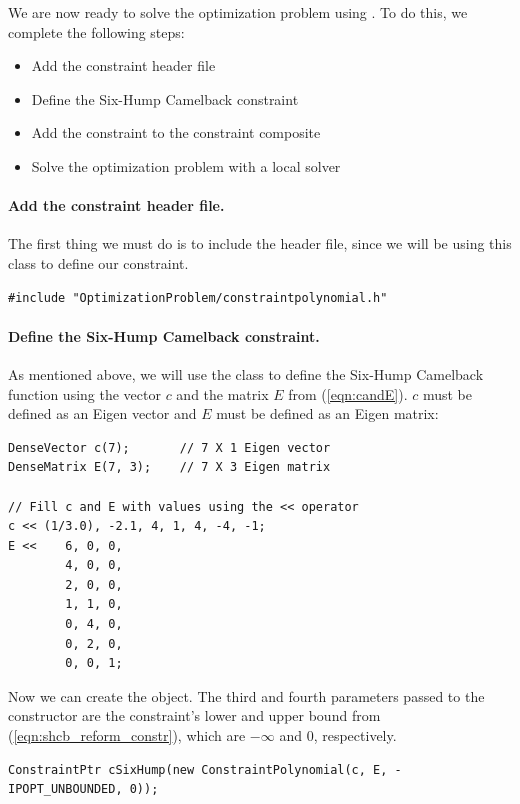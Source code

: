 We are now ready to solve the optimization problem using \solvername. To do this, we complete the following steps:
\begin{itemize}
\item Add the constraint header file
\item Define the Six-Hump Camelback constraint
\item Add the constraint to the constraint composite
\item Solve the optimization problem with a local solver
\end{itemize}

\paragraph{Add the constraint header file.} The first thing we must do is to include the  header file, since we will be using this class to define our constraint.
\begin{lstlisting}
#include "OptimizationProblem/constraintpolynomial.h"
\end{lstlisting}

\paragraph{Define the Six-Hump Camelback constraint.} As mentioned above, we will use the  class to define the Six-Hump Camelback function using the vector $c$ and the matrix $E$ from (\ref{eqn:candE}). $c$ must be defined as an Eigen vector and $E$ must be defined as an Eigen matrix:
\begin{lstlisting}
DenseVector c(7);		// 7 X 1 Eigen vector
DenseMatrix E(7, 3);	// 7 X 3 Eigen matrix

// Fill c and E with values using the << operator
c << (1/3.0), -2.1, 4, 1, 4, -4, -1;
E <<	6, 0, 0,
		4, 0, 0,
		2, 0, 0,
		1, 1, 0,
		0, 4, 0,
		0, 2, 0,
		0, 0, 1;
\end{lstlisting}
Now we can create the  object. The third and fourth parameters passed to the constructor are the constraint's lower and upper bound from (\ref{eqn:shcb_reform_constr}), which are $-\infty$ and $0$, respectively.
\begin{lstlisting}
ConstraintPtr cSixHump(new ConstraintPolynomial(c, E, -IPOPT_UNBOUNDED, 0));
\end{lstlisting}

